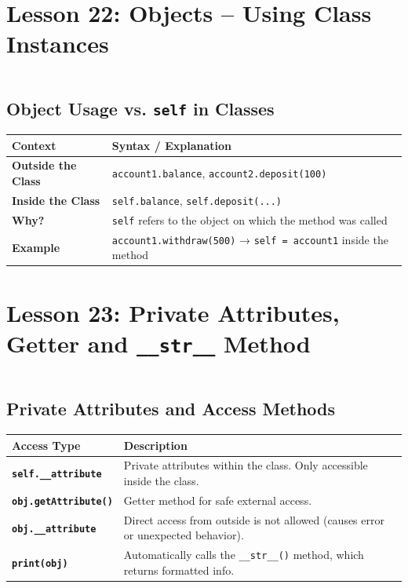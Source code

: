 \documentclass[a4paper,11pt]{article}
\begin{document}
	
\section{Lesson 22: Objects – Using Class Instances}
\inputminted{python}{Python_Files/object_usage_guid.py}

\vspace{1em}
\subsection*{Object Usage vs. \texttt{self} in Classes}

\renewcommand{\arraystretch}{1.6}
\begin{tabular}{>{\bfseries}p{5cm} p{8cm}}
	\toprule
	Context & Syntax / Explanation \\
	\midrule
	
	Outside the Class & \texttt{account1.balance}, \texttt{account2.deposit(100)} \\
	Inside the Class & \texttt{self.balance}, \texttt{self.deposit(...)} \\
	Why? & \texttt{self} refers to the object on which the method was called \\
	Example & \texttt{account1.withdraw(500)} → \texttt{self = account1} inside the method \\
	
	\bottomrule
\end{tabular}

	
\section{Lesson 23: Private Attributes, Getter and \texttt{\_\_str\_\_} Method}
\inputminted{python}{Python_Files/private_attribute_guid.py}

\vspace{1em}
\subsection*{Private Attributes and Access Methods}

\renewcommand{\arraystretch}{1.4}
\begin{tabular}{>{\bfseries}p{4.5cm} p{8.5cm}}
	\toprule
	Access Type & Description \\
	\midrule
	\texttt{self.\_\_attribute} & Private attributes within the class. Only accessible inside the class. \\
	\texttt{obj.getAttribute()} & Getter method for safe external access. \\
	\texttt{obj.\_\_attribute} & Direct access from outside is not allowed (causes error or unexpected behavior). \\
	\texttt{print(obj)} & Automatically calls the \texttt{\_\_str\_\_()} method, which returns formatted info. \\
	\bottomrule
\end{tabular}
\end{document}

